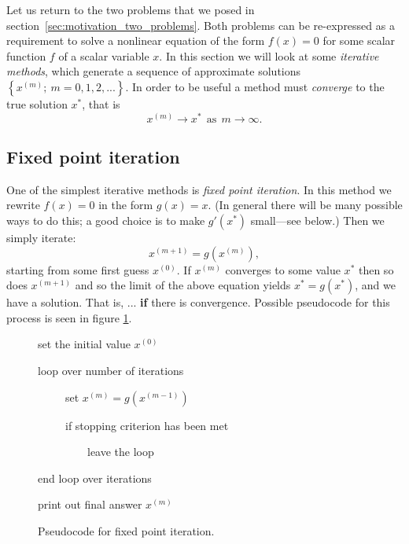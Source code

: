 Let us return to the two problems that we posed in
section~\ref{sec:motivation_two_problems}. Both problems can be re-expressed
as a requirement to solve
a nonlinear equation of the form $ f(x) = 0 $ for some scalar function $ f $
of a scalar variable $ x $. In this section we will look at some
\textit{iterative methods}, which generate
a sequence of approximate solutions
$ \left\{ x^{(m)} ; \ m=0, 1, 2, ... \right\} $. In order to be useful
a method must \textit{converge} to the
true solution $ x^{\mathrm{*}} $, that is
\begin{displaymath}
x^{(m)} \rightarrow x^{\mathrm{*}} \mathrm{\ \ as\ \ } m \rightarrow \infty. 
\end{displaymath}



\subsection{Fixed point iteration}
\label{sec:fpi}



One of the simplest iterative methods is \textit{fixed point iteration}.
In this method we 
rewrite $ f(x) = 0 $ in the form $ g(x) = x $. (In general there will be many
possible ways to do this; a good choice is to make $g'(x^*)$ small---see below.)
Then we simply iterate:
\begin{displaymath}
x^{(m+1)} = g(x^{(m)}) ,
\end{displaymath}
starting from some first guess $x^{(0)}$. 
If $x^{(m)}$ converges to some value $x^*$ then so does $x^{(m+1)}$ and so 
the limit of the above  equation yields $x^* = g(x^*)$, and we have a solution. That is, ... \textbf{if}  
there is convergence. Possible pseudocode for this process is seen in figure \ref{fig:flowchart_fpi}. 


\begin{figure}
{\tt

set the initial value $x^{(0)}$

loop over number of iterations 

\ \ \ \ \ set $x^{(m)} = g(x^{(m-1)})$ 

\ \ \ \ \ if stopping criterion has been met 

\ \ \ \ \ \ \ \ \ leave the loop

end loop over iterations

print out final answer  $x^{(m)}$

}
\caption{\label{fig:flowchart_fpi}
Pseudocode for fixed point iteration.
}
\end{figure}


